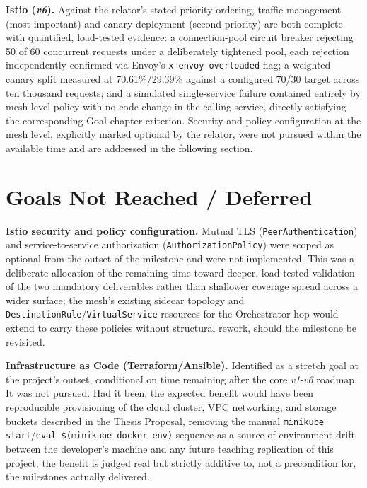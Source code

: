\documentclass[twoside]{supsistudent}
\begin{document}
\textbf{Istio (\emph{v6}).} Against the relator's stated priority ordering, traffic management (most important) and canary deployment (second priority) are both complete with quantified, load-tested evidence: a connection-pool circuit breaker rejecting 50 of 60 concurrent requests under a deliberately tightened pool, each rejection independently confirmed via Envoy's \texttt{x-envoy-overloaded} flag; a weighted canary split measured at 70.61\%/29.39\% against a configured 70/30 target across ten thousand requests; and a simulated single-service failure contained entirely by mesh-level policy with no code change in the calling service, directly satisfying the corresponding Goal-chapter criterion. Security and policy configuration at the mesh level, explicitly marked optional by the relator, were not pursued within the available time and are addressed in the following section.

\section{Goals Not Reached / Deferred}
\textbf{Istio security and policy configuration.} Mutual TLS (\texttt{PeerAuthentication}) and service-to-service authorization (\texttt{AuthorizationPolicy}) were scoped as optional from the outset of the milestone and were not implemented. This was a deliberate allocation of the remaining time toward deeper, load-tested validation of the two mandatory deliverables rather than shallower coverage spread across a wider surface; the mesh's existing sidecar topology and \texttt{DestinationRule}/\texttt{VirtualService} resources for the Orchestrator hop would extend to carry these policies without structural rework, should the milestone be revisited.

\textbf{Infrastructure as Code (Terraform/Ansible).} Identified as a stretch goal at the project's outset, conditional on time remaining after the core \emph{v1}-\emph{v6} roadmap. It was not pursued. Had it been, the expected benefit would have been reproducible provisioning of the cloud cluster, VPC networking, and storage buckets described in the Thesis Proposal, removing the manual \texttt{minikube start}/\texttt{eval \$(minikube docker-env)} sequence as a source of environment drift between the developer's machine and any future teaching replication of this project; the benefit is judged real but strictly additive to, not a precondition for, the milestones actually delivered.
\end{document}

